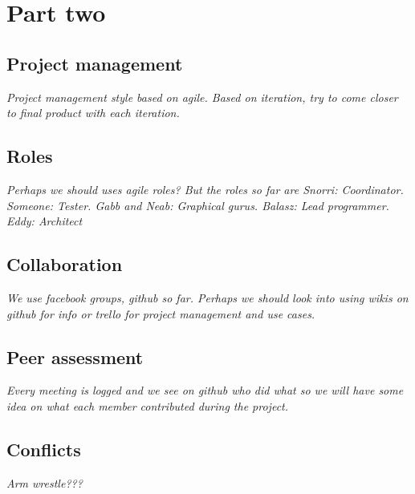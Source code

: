 \documentclass[11pt]{article}
\begin{document}
\section{Part two}
\subsection{Project management}
\textit{Project management style based on agile. Based on iteration, try to come closer to final product with each iteration.}
\subsection{Roles}
\textit{Perhaps we should uses agile roles? But the roles so far are Snorri: Coordinator. Someone: Tester. Gabb and Neab: Graphical gurus. Balasz: Lead programmer. Eddy: Architect}
\subsection{Collaboration}
\textit{We use facebook groups, github so far. Perhaps we should look into using wikis on github for info or trello for project management and use cases.}
\subsection{Peer assessment}
\textit{Every meeting is logged and we see on github who did what so we will have some idea on what each member contributed during the project. }
\subsection{Conflicts}
\textit{Arm wrestle???}

\end{document}
